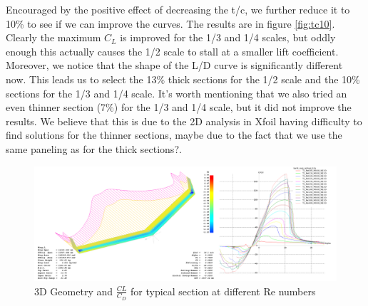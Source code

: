 \documentclass[titlepage,10pt]{article}
\begin{document}
Encouraged by the positive effect of decreasing the t/c, we further reduce it to 10\% to see if we can improve the curves. The results are in figure \ref{fig:tc10}. Clearly the maximum $C_L$ is improved for the 1/3 and 1/4 scales, but oddly enough this actually causes the 1/2 scale to stall at a smaller lift coefficient. Moreover, we notice that the shape of the L/D curve is significantly different now. This leads us to select the 13\% thick sections for the 1/2 scale and the 10\% sections for the 1/3 and 1/4 scale. It's worth mentioning that we also tried an even thinner section (7\%) for the 1/3 and 1/4 scale, but it did not improve the results. We believe that this is due to the 2D analysis in Xfoil having difficulty to find solutions for the thinner sections, maybe due to the fact that we use the same paneling as for the thick sections?. 

\enlargethispage{3\baselineskip}

\begin{landscape}
	\begin{figure}
	\begin{center}
	\includegraphics[width=220mm]{XFLR_3Dviews.png}
	\end{center}
	\caption{3D Geometry and $\frac{CL}{{C_D}}$ for typical section at different Re numbers}
	\label{fig:xflr3D}
	\end{figure}
\end{landscape}
\end{document}
